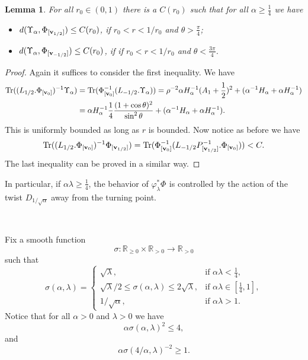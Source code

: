 \documentclass[a4paper,11pt]{amsart}
\newtheorem{lemma}[theorem]{Lemma}
\theoremstyle{definition}
\numberwithin{equation}{section}
\DeclareMathOperator{\Tr}{Tr}
\DeclareMathOperator{\bv}{{\bf v}}
\DeclareMathOperator{\TNam}{TN^{--}_\alpha}
\begin{document}
\begin{lemma}\label{l:TN rescale upsilon}
For all $r_0\in(0,1)$ there is a $C(r_0)$ such that for all ${\alpha}\geq \frac{1}{4}$ we have
\begin{itemize}
    \item $d(\Upsilon_{{\alpha}}, \Phi_{[\bv_{{1}/{2}}]})\leq  C(r_0)$, if $r_0<r<1/r_0$ and $\theta>\frac{\pi}{4}$;
    \item $d(\Upsilon_{{\alpha}}, \Phi_{[\bv_{-{1}/{2}}]})\leq  C(r_0)$, if if $r_0<r<1/r_0$ and $\theta<\frac{3\pi}{4}$.
\end{itemize}

\end{lemma}
\begin{proof}
	Again it suffices to consider the first inequality. We have 
    \begin{align*}
        \Tr((L_{1/2}.\Phi_{[\bv_0]})^{-1}\Upsilon_{ {\alpha}})&=\Tr(\Phi_{[\bv_0]}^{-1} (L_{{-{1}/{2}}}.\Upsilon_{ {\alpha}}))= \rho^{-2}{\alpha}H_\alpha^{-1}(A_1+\frac{1}{2})^2+({\alpha}^{-1}H_\alpha+{\alpha}H_\alpha^{-1})\\
        &=\alpha H_{\alpha}^{-1}\frac{1}{4}\frac{(1+\cos\theta)^2}{\sin^2\theta}+({\alpha}^{-1}H_\alpha+{\alpha}H_\alpha^{-1}).
    \end{align*}
    This is uniformly bounded as long as $r$ is bounded. Now notice as before we have
    $$\Tr((L_{1/2}.\Phi_{[\bv_0]})^{-1}\Phi_{[\bv_{1/2}]})=\Tr(\Phi_{[\bv_0]}^{-1}(L_{-1/2}P_{[\bv_{1/2}]}^{-1}.\Phi_{[\bv_0]}))<C.$$
    The last inequality can be proved in a similar way.
\end{proof}

In particular, if $\alpha\lambda\geq\frac14$, the behavior of $\varphi_\lambda^*\Phi^{\TNam}$ is controlled by the action of the twist $D_{{1}/{\sqrt{\alpha}}}$ away from the turning point. 

\



Fix a smooth function  
\[
\sigma: \mathbb{R}_{\geq 0} \times \mathbb{R}_{>0} \to \mathbb{R}_{>0}
\]  
such that  
\begin{equation}\label{e:definition of sigma}
\sigma(\alpha, \lambda) =
\begin{cases}
    \sqrt{\lambda}, & \text{if } \alpha\lambda < \frac{1}{4}, \\ 
 \sqrt{\lambda}/2 \leq \sigma(\alpha, \lambda) \leq 2\sqrt{\lambda}, & \text{if } \alpha\lambda \in [\frac{1}{4},1],\\
    1/\sqrt{\alpha}, & \text{if } \alpha\lambda >1.
\end{cases}
\end{equation}
Notice that for all $\alpha>0$ and $\lambda>0$ we have
\begin{equation}\label{e:bound on sigma}\alpha\sigma(\alpha, \lambda)^2\leq 4,
\end{equation}
and 
\begin{equation}\label{e:bound on sigma2}
\alpha \sigma(4/\alpha, \lambda)^{-2}\geq 1. 
\end{equation}
\end{document}
